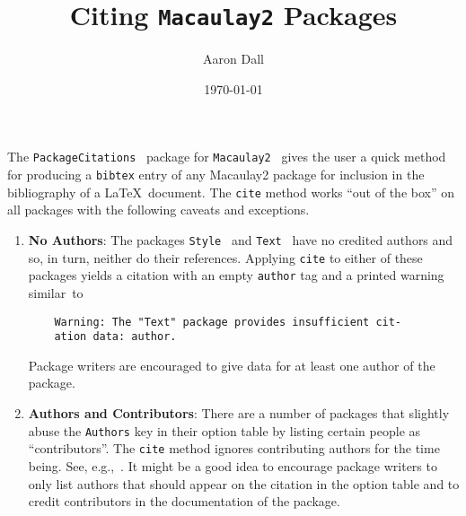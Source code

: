 \documentclass[11pt]{article}
\begin{document}
\title{Citing \texttt{Macaulay2} Packages}
\author{Aaron Dall}
\date{\today}
\maketitle

The \texttt{PackageCitations}~\cite{PackageCitationsSource} package for \texttt{Macaulay2}~\cite{M2} gives the user a quick method for producing a \texttt{bibtex} entry of any Macaulay2 package for inclusion in the bibliography of a \LaTeX~document. The \texttt{cite} method works ``out of the box'' on all packages with the following caveats and exceptions.

\begin{enumerate}
	\item \textbf{No Authors}: The packages \texttt{Style}~\cite{StyleSource} and \texttt{Text}~\cite{TextSource} have no credited authors and so, in turn, neither do their references. Applying \texttt{cite} to either of these packages yields a citation with an empty \texttt{author} tag and a printed warning similar~to
	\begin{verbatim}
	Warning: The "Text" package provides insufficient cit-
	ation data: author.
	\end{verbatim}
	Package writers are encouraged to give data for at least one author of the package.

	\item \textbf{Authors and Contributors}: There are a number of packages that slightly abuse the \texttt{Authors} key in their option table by listing certain people as ``contributors''. The \texttt{cite} method ignores contributing authors for the time being. See, e.g.,~\cite{VisualizeSource,GraphsSource,GraphicsSource,PHCpackSource}. It might be a good idea to encourage package writers to only list authors that should appear on the citation in the option table and to credit contributors in the documentation of the package.


\end{enumerate}
\end{document}
